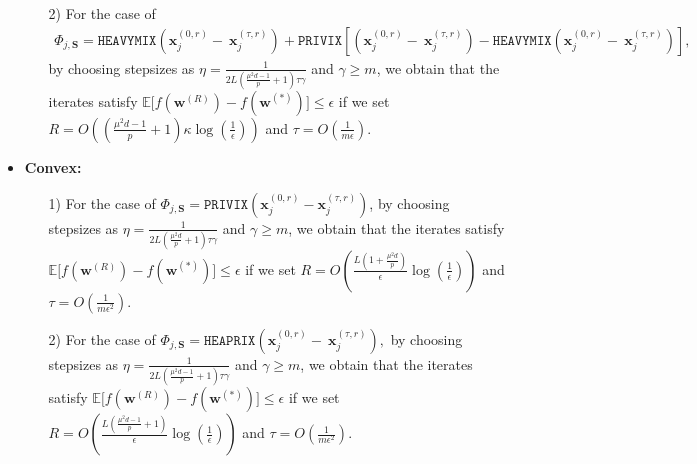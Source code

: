\begin{theorem}
\begin{itemize}
\begin{itemize}
          \item[2)] For the case of 
         \begin{align}
    \Phi_{j,\mathbf{S}}=\texttt{HEAVYMIX}\left(\boldsymbol{x}_j^{(0,r)}-~{\boldsymbol{x}}_{j}^{(\tau,r)}\right)+\texttt{PRIVIX}\left[\left(\boldsymbol{x}_j^{(0,r)}-~{\boldsymbol{x}}_{j}^{(\tau,r)}\right)-\texttt{HEAVYMIX}\left(\boldsymbol{x}_j^{(0,r)}-~{\boldsymbol{x}}_{j}^{(\tau,r)}\right)\right],
\end{align}
by choosing stepsizes as $\eta=\frac{1}{2L\left(\frac{\mu^2d-1}{p}+1\right)\tau\gamma}$ and $\gamma\geq m$, we obtain that the iterates satisfy $\mathbb{E}\Big[f({\boldsymbol{w}}^{(R)})-f({\boldsymbol{w}}^{(*)})\Big]\leq \epsilon$ if  we set
     $R=O\left(\left(\frac{\mu^2d-1}{p}+1\right)\kappa\log\left(\frac{1}{\epsilon}\right)\right)$ and $ \tau=O\left(\frac{1}{m\epsilon}\right)$. 
      \end{itemize}
      
     \item \textbf{Convex:}
     \begin{itemize}
         \item[1)]For the case of $\Phi_{j,\mathbf{S}}=\texttt{PRIVIX}\left(\boldsymbol{x}_j^{(0,r)}-\boldsymbol{x}_j^{(\tau,r)}\right)$, by choosing stepsizes as $\eta=\frac{1}{2L\left(\frac{\mu^2d}{p}+1\right)\tau\gamma}$ and $\gamma\geq m$, we obtain that the iterates satisfy $ \mathbb{E}\Big[f({\boldsymbol{w}}^{(R)})-f({\boldsymbol{w}}^{(*)})\Big]\leq \epsilon$ if we set
     $R=O\left(\frac{L\left(1+\frac{\mu^2d}{p}\right)}{\epsilon}\log\left(\frac{1}{\epsilon}\right)\right)$ and $ \tau=O\left(\frac{1}{m\epsilon^2}\right).$
         \item[2)] For the case of 
         $
    \Phi_{j,\mathbf{S}}=\texttt{HEAPRIX}\left(\boldsymbol{x}_j^{(0,r)}-~{\boldsymbol{x}}_{j}^{(\tau,r)}\right),$
by choosing stepsizes as $\eta=\frac{1}{2L\left(\frac{\mu^2d-1}{p}+1\right)\tau\gamma}$ and $\gamma\geq m$, we obtain that the iterates satisfy $ \mathbb{E}\Big[f({\boldsymbol{w}}^{(R)})-f({\boldsymbol{w}}^{(*)})\Big]\leq \epsilon$ if we set
     $R=O\left(\frac{L\left(\frac{\mu^2d-1}{p}+1\right)}{\epsilon}\log\left(\frac{1}{\epsilon}\right)\right)$ and $ \tau=O\left(\frac{1}{m\epsilon^2}\right).$ 
     \end{itemize}
 \end{itemize}
\end{theorem}








